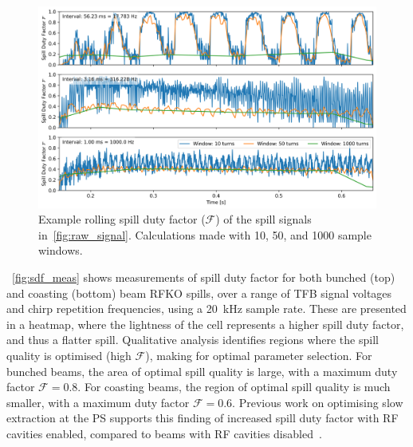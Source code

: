 \documentclass[a4paper,twoside,11pt]{report}
\begin{document}
\begin{figure}
  \centering
  \includegraphics[width=0.8\linewidth]{sdfs.png}
  \caption[Example spill duty factor calculations]{Example rolling spill duty factor ($\mathcal{F}$) of the spill signals in~\autoref{fig:raw_signal}. Calculations made with 10, 50, and 1000 sample windows.}\label{fig:sdf_example}
\end{figure}

~\autoref{fig:sdf_meas} shows measurements of spill duty factor for both bunched (top) and coasting (bottom) beam RFKO spills, over a range of TFB signal voltages and chirp repetition frequencies, using a \qty{20}{\kilo\hertz} sample rate. These are presented in a heatmap, where the lightness of the cell represents a higher spill duty factor, and thus a flatter spill. Qualitative analysis identifies regions where the spill quality is optimised (high $\mathcal{F}$), making for optimal parameter selection. For bunched beams, the area of optimal spill quality is large, with a maximum duty factor $\mathcal{F} = 0.8$. For coasting beams, the region of optimal spill quality is much smaller, with a maximum duty factor $\mathcal{F} = 0.6$. Previous work on optimising slow extraction at the PS supports this finding of increased spill duty factor with RF cavities enabled, compared to beams with RF cavities disabled~\cite{Cappi:134321}.
\end{document}
